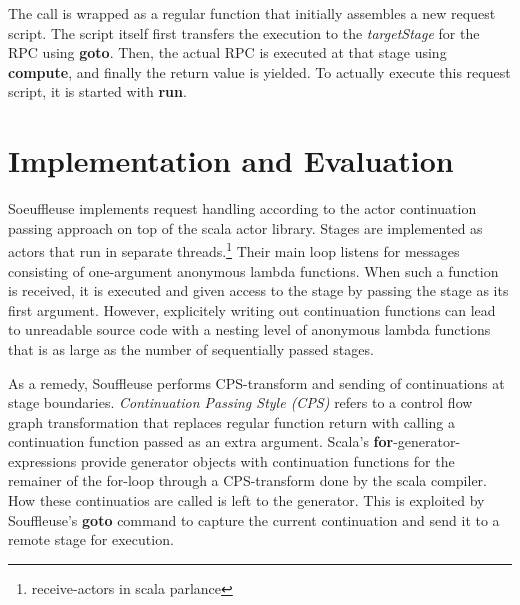 \documentclass{sig-alternate}
\begin{document}
The call is wrapped as a regular function that initially assembles a new request script. The script
itself first transfers the execution to the \emph{targetStage} for the RPC using \textbf{goto}.
Then, the actual RPC is executed at that stage using \textbf{compute}, and finally the return value
is yielded. To actually execute this request script, it is started with \textbf{run}.




	

\section{Implementation and Evaluation}
                                   

Soeuffleuse implements request handling according to the actor continuation passing approach on top
of the scala actor library. Stages are implemented as actors that run in separate
threads.\footnote{receive-actors in scala parlance} Their main loop listens for messages consisting
of one-argument anonymous lambda functions. When such a function is received, it is executed and
given access to the stage by passing the stage as its first argument. However, explicitely writing
out continuation functions can lead to unreadable source code with a nesting level of anonymous
lambda functions that is as large as the number of sequentially passed stages.

As a remedy, Souffleuse performs CPS-transform and sending of continuations at stage boundaries.
\emph{Continuation Passing Style (CPS)} refers to a control flow graph transformation that replaces
regular function return with calling a continuation function passed as an extra argument. Scala's
\textbf{for}-generator-expressions provide generator objects with continuation functions for the
remainer of the for-loop through a CPS-transform done by the scala compiler. How these continuatios
are called is left to the generator. This is exploited by Souffleuse's \textbf{goto} command to
capture the current continuation and send it to a remote stage for execution.
\end{document}
